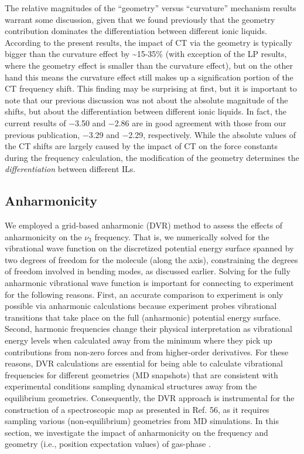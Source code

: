 The relative magnitudes of the ``geometry'' versus ``curvature'' mechanism results warrant some discussion, given that we found previously that the geometry contribution dominates the differentiation between different ionic liquids. According to the present results, the impact of CT via the geometry is typically bigger than the curvature effect by \textasciitilde{}15-35\% (with exception of the LP results, where the geometry effect is smaller than the curvature effect), but on the other hand this means the curvature effect still makes up a signification portion of the CT frequency shift. This finding may be surprising at first, but it is important to note that our previous discussion was not about the absolute magnitude of the shifts, but about the differentiation between different ionic liquids. In fact, the current results of \num{-3.50} and \SI{-2.86}{\wavenumber} are in good agreement with those from our previous publication, \SI{-3.29}{\wavenumber} and \SI{-2.29}{\wavenumber}, respectively. While the absolute values of the CT shifts are largely caused by the impact of CT on the force constants during the frequency calculation, the modification of the geometry determines the \emph{differentiation} between different ILs.

\subsection{Anharmonicity}
\label{paper_02:ssec:IIIB}

We employed a grid-based anharmonic (DVR) method to assess the effects of anharmonicity on the  \(\nu_{3}\) frequency. That is, we numerically solved for the vibrational wave function on the discretized potential energy surface spanned by two degrees of freedom for the  molecule (along the  axis), constraining the degrees of freedom involved in  bending modes, as discussed earlier. Solving for the fully anharmonic vibrational wave function is important for connecting to experiment for the following reasons. First, an accurate comparison to experiment is only possible via anharmonic calculations because experiment probes vibrational transitions that take place on the full (anharmonic) potential energy surface. Second, harmonic frequencies change their physical interpretation as vibrational energy levels when calculated away from the minimum where they pick up contributions from non-zero forces and from higher-order derivatives. For these reasons, DVR calculations are essential for being able to calculate vibrational frequencies for different geometries (MD snapshots) that are consistent with experimental conditions sampling dynamical structures away from the equilibrium geometries. Consequently, the DVR approach is instrumental for the construction of a spectroscopic map as presented in Ref. 56, as it requires sampling various (non-equilibrium) geometries from MD simulations. In this section, we investigate the impact of anharmonicity on the frequency and geometry (i.e., position expectation values) of gas-phase .

